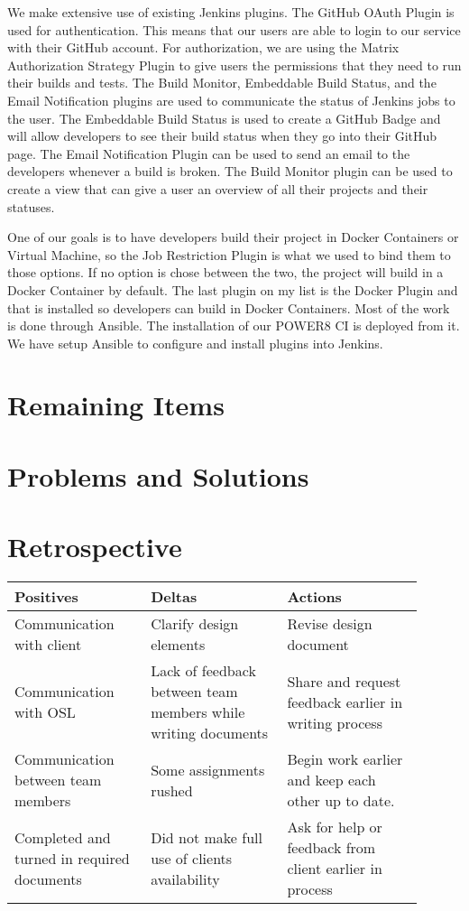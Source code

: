 \documentclass[10pt,onecolumn,journal,draftclsnofoot]{IEEEtran}
\begin{document}
We make extensive use of existing Jenkins plugins.
The GitHub OAuth Plugin is used for authentication.
This means that our users are able to login to our service with their GitHub account.
For authorization, we are using the Matrix Authorization Strategy Plugin to give users the permissions that they need to run their builds and tests.
The Build Monitor, Embeddable Build Status, and the Email Notification plugins are used to communicate the status of Jenkins jobs to the user.
The Embeddable Build Status is used to create a GitHub Badge and will allow developers to see their build status when they go into their GitHub page.
The Email Notification Plugin can be used to send an email to the developers whenever a build is broken.
The Build Monitor plugin can be used to create a view that can give a user an overview of all their projects and their statuses.


One of our goals is to have developers build their project in Docker Containers or Virtual Machine, so the Job Restriction Plugin is what we used to bind them to those options.
If no option is chose between the two, the project will build in a Docker Container by default.
The last plugin on my list is the Docker Plugin and that is installed so developers can build in Docker Containers.
Most of the work is done through Ansible.
The installation of our POWER8 CI is deployed from it.
We have setup Ansible to configure and install plugins into Jenkins.


\section{Remaining Items}

\section{Problems and Solutions}

\section{Retrospective}
\begin{center}
	\begin{tabular}{| p{0.3\linewidth} | p{0.3\linewidth} | p{0.3\linewidth} |}\hline
		Positives & Deltas & Actions \\ \hline
		Communication with client & Clarify design elements 	& Revise design document \\ \hline
		Communication with OSL & Lack of feedback between team members while writing documents & Share and request feedback earlier in writing process \\ \hline
		Communication between team members	& Some assignments rushed & Begin work earlier and keep each other up to date. \\ \hline
		Completed and turned in required documents & Did not make full use of clients availability & Ask for help or feedback from client earlier in process \\ \hline
	\end{tabular}
\end{center}
\end{document}
